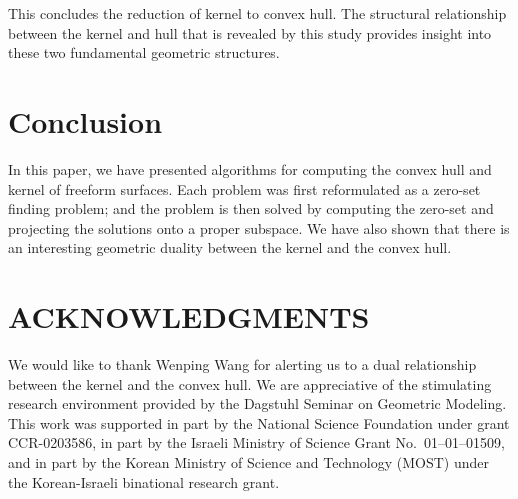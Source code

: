 \documentclass{elsart}
\begin{document}
This concludes the reduction of kernel to convex hull.
The structural relationship between the kernel and hull that is revealed
by this study provides insight into these two fundamental geometric structures.

\section{Conclusion}
\label{sec-conclusion}
In this paper, we have presented algorithms for computing
the convex hull and kernel of freeform surfaces.
Each problem was first reformulated as a zero-set finding problem;
and the problem is then solved by computing the zero-set and
projecting the solutions onto a proper subspace.
We have also shown that there is an interesting geometric duality
between the kernel and the convex hull.


\section*{ACKNOWLEDGMENTS}

We would like to thank Wenping Wang for alerting us
to a dual relationship between the kernel and the convex hull.
We are appreciative of the stimulating research environment
provided by the Dagstuhl Seminar on Geometric Modeling.
This work was supported in part by the National Science Foundation under 
grant CCR-0203586, in part by the Israeli Ministry of Science
Grant No.~01--01--01509, and in part by
the Korean Ministry of Science and Technology (MOST) under the
Korean-Israeli binational research grant.



\end{document}
